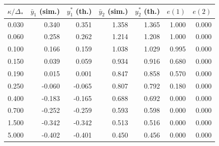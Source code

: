 \begin{tabular}{rrrrrrr}
\toprule
$\kappa/\Delta_\ast$ & $\bar y_1$ (sim.) & $y_1^\ast$ (th.) & $\bar y_2$ (sim.) & $y_2^\ast$ (th.) & $e(1)$ & $e(2)$ \\
\midrule
0.030 & 0.340 & 0.351 & 1.358 & 1.365 & 1.000 & 0.000 \\
0.060 & 0.258 & 0.262 & 1.214 & 1.208 & 1.000 & 0.000 \\
0.100 & 0.166 & 0.159 & 1.038 & 1.029 & 0.995 & 0.000 \\
0.150 & 0.039 & 0.059 & 0.934 & 0.916 & 0.680 & 0.000 \\
0.190 & 0.015 & 0.001 & 0.847 & 0.858 & 0.570 & 0.000 \\
0.250 & -0.060 & -0.065 & 0.807 & 0.792 & 0.180 & 0.000 \\
0.400 & -0.183 & -0.165 & 0.688 & 0.692 & 0.000 & 0.000 \\
0.700 & -0.252 & -0.259 & 0.593 & 0.598 & 0.000 & 0.000 \\
1.500 & -0.342 & -0.342 & 0.513 & 0.516 & 0.000 & 0.000 \\
5.000 & -0.402 & -0.401 & 0.450 & 0.456 & 0.000 & 0.000 \\
\bottomrule
\end{tabular}
